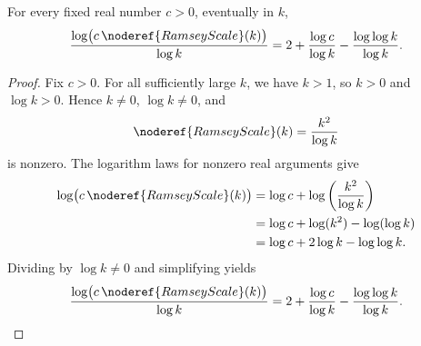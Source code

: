 \begin{helper}
For every fixed real number \(c>0\), eventually in \(k\),
\[
\frac{\log\bigl(c\,\noderef{RamseyScale}(k)\bigr)}{\log k}
=2+\frac{\log c}{\log k}-\frac{\log\log k}{\log k}.
\]
\end{helper}
\begin{proof}
Fix \(c>0\).  For all sufficiently large \(k\), we have \(k>1\), so
\(k>0\) and \(\log k>0\).  Hence \(k\ne0\), \(\log k\ne0\), and
\[
\noderef{RamseyScale}(k)=\frac{k^2}{\log k}
\]
is nonzero.  The logarithm laws for nonzero real arguments give
\[
\begin{aligned}
\log\bigl(c\,\noderef{RamseyScale}(k)\bigr)
&=\log c+\log\left(\frac{k^2}{\log k}\right)\\
&=\log c+\log(k^2)-\log(\log k)\\
&=\log c+2\log k-\log\log k.
\end{aligned}
\]
Dividing by \(\log k\ne0\) and simplifying yields
\[
\frac{\log\bigl(c\,\noderef{RamseyScale}(k)\bigr)}{\log k}
=2+\frac{\log c}{\log k}-\frac{\log\log k}{\log k}.
\]
\end{proof}
